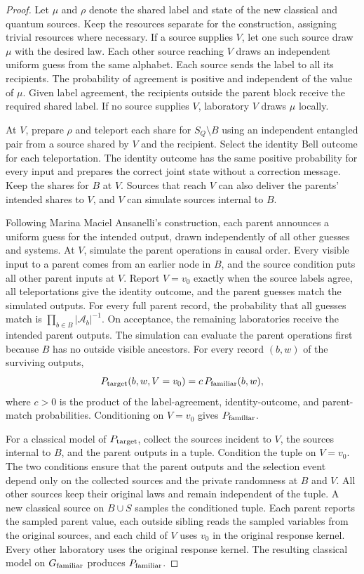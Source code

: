 \begin{proof}
Let \(\mu\) and \(\rho\) denote the shared label and state of the new
classical and quantum sources. Keep the resources separate for the
construction, assigning trivial resources where necessary. If a source
supplies \(V\), let one such source draw \(\mu\) with the desired law.
Each other source reaching \(V\) draws an independent uniform guess from
the same alphabet. Each source sends the label to all its recipients.
The probability of agreement is positive and independent of the value of
\(\mu\). Given label agreement, the recipients outside the parent block
receive the required shared label. If no source supplies \(V\),
laboratory \(V\) draws \(\mu\) locally.

At \(V\), prepare \(\rho\) and teleport each share for \(S_Q\setminus B\)
using an independent entangled pair from a source shared by \(V\) and the
recipient. Select the identity Bell outcome for each teleportation. The
identity outcome has the same positive probability for every input and
prepares the correct joint state without a correction message. Keep the
shares for \(B\) at \(V\). Sources that reach \(V\) can also deliver the
parents' intended shares to \(V\), and \(V\) can simulate sources internal
to \(B\).

Following Marina Maciel Ansanelli's construction, each parent announces
a uniform guess for the intended output, drawn independently of all other
guesses and systems. At \(V\), simulate the parent operations
in causal order. Every visible input to a parent comes from an earlier node
in \(B\), and the source condition puts all other parent inputs at \(V\).
Report \(V=v_0\) exactly when the source labels agree, all teleportations
give the identity outcome, and the parent guesses match the simulated
outputs. For every full parent record, the probability that all guesses
match is \(\prod_{b\in B}|\mathcal A_b|^{-1}\). On
acceptance, the remaining laboratories receive the intended parent
outputs. The simulation can evaluate the parent operations first because
\(B\) has no outside visible ancestors. For every record \((b,w)\) of the
surviving outputs,
\[
  P_{\text{target}}(b,w,V=v_0)=c\,P_{\text{familiar}}(b,w),
\]
where \(c>0\) is the product of the label-agreement, identity-outcome, and
parent-match probabilities. Conditioning on \(V=v_0\) gives \(P_{\text{familiar}}\).

For a classical model of \(P_{\text{target}}\), collect the sources incident to
\(V\), the sources internal to \(B\), and the parent outputs in a tuple.
Condition the tuple on \(V=v_0\). The two conditions ensure that the
parent outputs and the selection event depend only on the collected
sources and the private randomness at \(B\) and \(V\). All other sources
keep their original laws and remain independent of the tuple. A new
classical source on \(B\cup S\) samples the conditioned tuple. Each parent
reports the sampled parent value, each outside sibling reads the sampled
variables from the original sources, and each child of \(V\) uses \(v_0\)
in the original response kernel. Every other laboratory uses the original response kernel. The resulting
classical model on \(G_{\text{familiar}}\) produces \(P_{\text{familiar}}\).
\end{proof}
